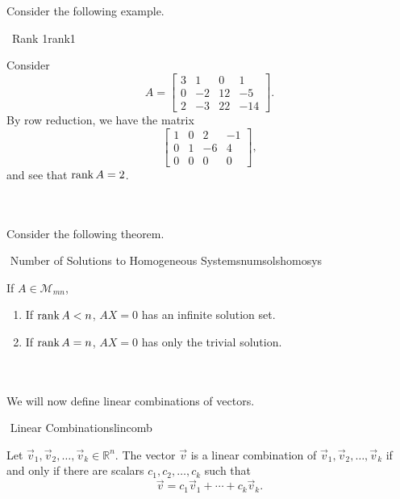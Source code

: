         \vphantom
        \\
        \\
        Consider the following example.
        \begin{example}{\Difficulty\,\Difficulty\,\,Rank 1}{rank1}
        
            Consider
            \begin{equation*}
                A=\begin{bmatrix}
                3 & 1 & 0 & 1 \\
                0 & -2 & 12 & -5 \\
                2 & -3 & 22 & -14
                \end{bmatrix}.
            \end{equation*}
            By row reduction, we have the matrix
            \begin{equation*}
                \begin{bmatrix}
                1 & 0 & 2 & -1 \\
                0 & 1 & -6 & 4 \\
                0 & 0 & 0 & 0
                \end{bmatrix},
            \end{equation*}
            and see that \(\text{rank\,} A=2\).
        \end{example}
        \vphantom
        \\
        \\
        Consider the following theorem. 
        \begin{theorem}{\Stop\,\,Number of Solutions to Homogeneous Systems}{numsolshomosys}
        
            If \(A\in\mathcal{M}_{mn}\),
            \begin{enumerate}
                \item If \(\text{rank\,} A< n\), \(AX=0\) has an infinite solution set.
                \item If \(\text{rank\,} A= n\), \(AX=0\) has only the trivial solution.
            \end{enumerate}
        
        \end{theorem}
        \vphantom
        \\
        \\
        We will now define linear combinations of vectors.
        \begin{definition}{\Stop\,\,Linear Combinations}{lincomb}
    
            Let \(\vec{v}_1,\vec{v}_2,\ldots,\vec{v}_k\in\mathbb{R}^n\). The vector \(\vec{v}\) is a linear combination of \(\vec{v}_1,\vec{v}_2,\ldots,\vec{v}_k\) if and only if there are scalars \(c_1,c_2,\ldots,c_k\) such that 
            \begin{equation*}
                \vec{v}=c_1\vec{v}_1+\cdots+c_k\vec{v}_k.
            \end{equation*}
            
        \end{definition}
